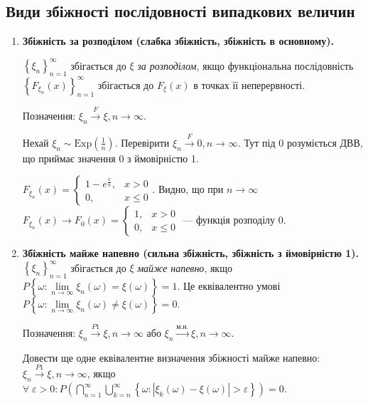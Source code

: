 \subsection{Види збіжності послідовності випадкових величин}
\begin{enumerate}
    \item \textbf{Збіжність за розподілом (слабка збіжність, збіжність в основному).}

    \noindent$\left\{ \xi_n\right\}_{n=1}^{\infty}$ збігається до $\xi$ \emph{за розподілом}, якщо функціональна послідовність
    $\left\{ F_{\xi_n} (x)\right\}_{n=1}^{\infty}$ збігається до $F_{\xi}(x)$ в точках її неперервності.

    Позначення: $\xi_n \overset{F}{\longrightarrow} \xi, n \to \infty$.
    \begin{example}
        Нехай $\xi_n \sim \mathrm{Exp}(\frac{1}{n})$. Перевірити $\xi_n \overset{F}{\to} 0, n \to \infty$.
        Тут під 0 розуміється ДВВ, що приймає значення 0 з ймовірністю 1.

        $F_{\xi_n}(x) = \begin{cases}
            1 - e^{\frac{x}{n}}, & x > 0 \\
            0, & x \leq 0
        \end{cases}$. Видно, що при $n \to \infty$ $F_{\xi_n}(x) \to F_0(x) = \begin{cases}
            1, & x > 0 \\
            0, & x \leq 0
        \end{cases}
        $ --- функція розподілу 0.
    \end{example}
    \item \textbf{Збіжність майже напевно (сильна збіжність, збіжність з ймовірністю 1).}
    \noindent$\left\{ \xi_n\right\}_{n=1}^{\infty}$ збігається до $\xi$ \emph{майже напевно}, якщо
    $P\left\{ \omega: \underset{n\to\infty}{\lim} \xi_n(\omega) = \xi(\omega)\right\} = 1$. 
    Це еквівалентно умові $P\left\{ \omega: \underset{n\to\infty}{\lim} \xi_n(\omega) \neq \xi(\omega)\right\} = 0$.

    Позначення: $\xi_n \overset{P1}{\longrightarrow} \xi, n \to \infty$ або $\xi_n \overset{\text{м.н.}}{\longrightarrow} \xi, n \to \infty$.
    \begin{exercise}
        Довести ще одне еквівалентне визначення збіжності майже напевно: $\xi_n \overset{P1}{\longrightarrow} \xi, n \to \infty$, якщо
        $\forall \; \varepsilon > 0: P\left( \bigcap\limits_{n=1}^{\infty} \bigcup\limits_{k = n}^{\infty}
        \left\{ \omega : \left| \xi_k(\omega) - \xi(\omega)\right| > \varepsilon\right\}\right) = 0$.
    \end{exercise}
    

\end{enumerate}
